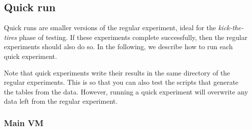 \documentclass[12pt]{article}
\begin{document}
\subsection{Quick run}
\label{sec:quickrun}

Quick runs are smaller versions of the regular experiment, ideal for the
\emph{kick-the-tires} phase of testing.  If these experiments complete
successfully, then the regular experiments should also do so.  In the following,
we describe how to run each quick experiment.

Note that quick experiments write their results in the same directory of the
regular experiments.  This is so that you can also test the scripts that
generate the tables from the data.  However, running a quick experiment will
overwrite any data left from the regular experiment.

\subsubsection{Main VM}
\end{document}
